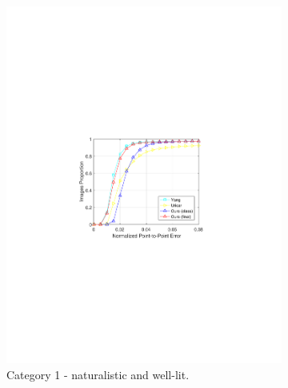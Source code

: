 \documentclass[letterpaper]{article} %
\begin{document}
\begin{figure}[t]
    \centering
    \begin{subfigure}[b]{0.3\textwidth}
        \centering
        \includegraphics[width=\textwidth]{fig/C1Curve.pdf}
            \caption{{\small Category 1 - naturalistic and well-lit.}}
        \end{subfigure}
        \qquad
        \begin{subfigure}[b]{0.3\textwidth}   
            \centering 

\end{subfigure}
\end{figure}
\end{document}
